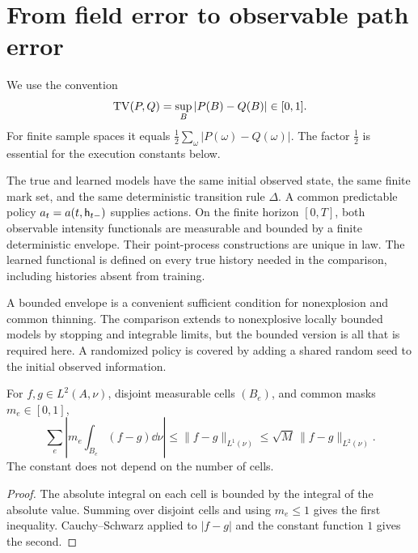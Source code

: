 \section{From field error to observable path error}\label{sec:main}
We use the convention
\[
 \operatorname{TV}(P,Q)=\sup_{B}|P(B)-Q(B)|\in[0,1].
\]
For finite sample spaces it equals $\frac12\sum_\omega|P(\omega)-Q(\omega)|$.
The factor $\frac12$ is essential for the execution constants below.

\begin{assumption}\label{ass:simulator}
The true and learned models have the same initial observed state, the same finite mark set, and the same deterministic transition rule $\Delta$. A common predictable policy $a_t=a(t,\mathsf h_{t-})$ supplies actions. On the finite horizon $[0,T]$, both observable intensity functionals are measurable and bounded by a finite deterministic envelope. Their point-process constructions are unique in law. The learned functional is defined on every true history needed in the comparison, including histories absent from training.
\end{assumption}

A bounded envelope is a convenient sufficient condition for nonexplosion and common thinning. The comparison extends to nonexplosive locally bounded models by stopping and integrable limits, but the bounded version is all that is required here. A randomized policy is covered by adding a shared random seed to the initial observed information.

\begin{lemma}\label{lem:cells}
For $f,g\in L^2(A,\nu)$, disjoint measurable cells $(B_e)$, and common masks $m_e\in[0,1]$,
\begin{equation}\label{eq:cell-contraction}
 \sum_e\left|m_e\int_{B_e}(f-g)\dd\nu\right|
 \le\|f-g\|_{L^1(\nu)}
 \le\sqrt M\,\|f-g\|_{L^2(\nu)}.
\end{equation}
The constant does not depend on the number of cells.
\end{lemma}
\begin{proof}
The absolute integral on each cell is bounded by the integral of the absolute value. Summing over disjoint cells and using $m_e\le1$ gives the first inequality. Cauchy--Schwarz applied to $|f-g|$ and the constant function $1$ gives the second.
\end{proof}

